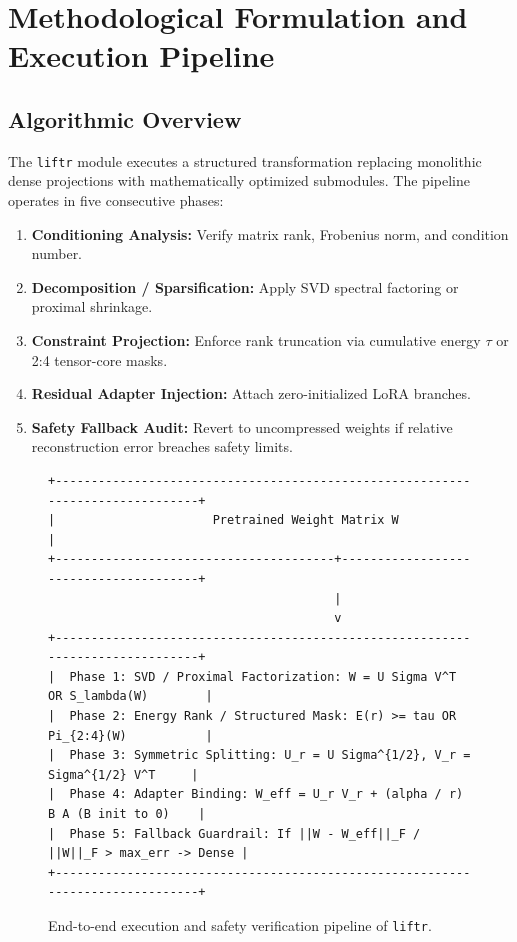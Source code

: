 \section{Methodological Formulation and Execution Pipeline}

\subsection{Algorithmic Overview}
The \texttt{liftr} module executes a structured transformation replacing monolithic dense projections with mathematically optimized submodules. The pipeline operates in five consecutive phases:
\begin{enumerate}
\item \textbf{Conditioning Analysis:} Verify matrix rank, Frobenius norm, and condition number.
\item \textbf{Decomposition / Sparsification:} Apply SVD spectral factoring or proximal shrinkage.
\item \textbf{Constraint Projection:} Enforce rank truncation via cumulative energy $\tau$ or 2:4 tensor-core masks.
\item \textbf{Residual Adapter Injection:} Attach zero-initialized LoRA branches.
\item \textbf{Safety Fallback Audit:} Revert to uncompressed weights if relative reconstruction error breaches safety limits.
\end{enumerate}

\begin{figure}[t]
\centering
\begin{verbatim}
+-------------------------------------------------------------------------------+
|                      Pretrained Weight Matrix W                               |
+---------------------------------------+---------------------------------------+
                                        |
                                        v
+-------------------------------------------------------------------------------+
|  Phase 1: SVD / Proximal Factorization: W = U Sigma V^T OR S_lambda(W)        |
|  Phase 2: Energy Rank / Structured Mask: E(r) >= tau OR Pi_{2:4}(W)           |
|  Phase 3: Symmetric Splitting: U_r = U Sigma^{1/2}, V_r = Sigma^{1/2} V^T     |
|  Phase 4: Adapter Binding: W_eff = U_r V_r + (alpha / r) B A (B init to 0)    |
|  Phase 5: Fallback Guardrail: If ||W - W_eff||_F / ||W||_F > max_err -> Dense |
+-------------------------------------------------------------------------------+
\end{verbatim}
\caption{End-to-end execution and safety verification pipeline of \texttt{liftr}.}
\end{figure}


